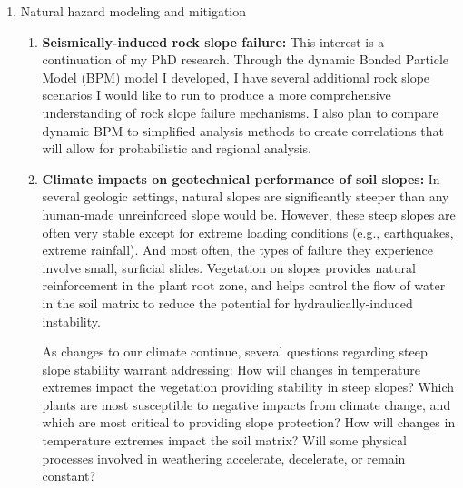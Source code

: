 \documentclass[10pt,letterpaper]{article}
\begin{document}
\begin{enumerate}
\item Natural hazard modeling and mitigation
\begin{enumerate}
\item \textbf{Seismically-induced rock slope failure:} This interest is a continuation of my PhD research.
Through the dynamic Bonded Particle Model (BPM) model I developed, I have several additional rock slope scenarios I would like to run to produce a more comprehensive understanding of rock slope failure mechanisms.
I also plan to compare dynamic BPM to simplified analysis methods to create correlations that will allow for probabilistic and regional analysis.
\item \textbf{Climate impacts on geotechnical performance of soil slopes:} In several geologic settings, natural slopes are significantly steeper than any human-made unreinforced slope would be. 
However, these steep slopes are often very stable except for extreme loading conditions (e.g., earthquakes, extreme rainfall).
And most often, the types of failure they experience involve small, surficial slides.
Vegetation on slopes provides natural reinforcement in the plant root zone, and helps control the flow of water in the soil matrix to reduce the potential for hydraulically-induced instability.

As changes to our climate continue, several questions regarding steep slope stability warrant addressing:
How will changes in temperature extremes impact the vegetation providing stability in steep slopes? Which plants are most susceptible to negative impacts from climate change, and which are most critical to providing slope protection?
How will changes in temperature extremes impact the soil matrix? Will some physical processes involved in weathering accelerate, decelerate, or remain constant?


\end{enumerate}
\end{enumerate}
\end{document}
